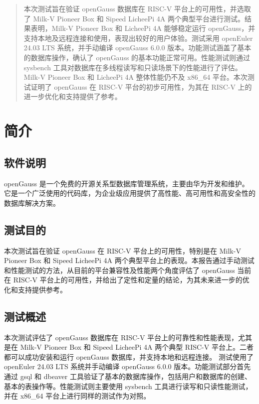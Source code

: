 \documentclass{article}
\begin{document}
\maketitle

\begin{abstract}
本次测试旨在验证 openGauss 数据库在 RISC-V 平台上的可用性，并选取了 Milk-V Pioneer Box 和 Sipeed LicheePi 4A 两个典型平台进行测试。结果表明，Milk-V Pioneer Box 和 LicheePi 4A 能够稳定运行 openGauss，并支持本地及远程连接和使用，表现出较好的用户体验。测试采用 openEuler 24.03 LTS 系统，并手动编译 openGauss 6.0.0 版本。功能测试涵盖了基本的数据库操作，确认了 openGauss 的基本功能正常可用。性能测试则通过 sysbench 工具对数据库在多线程读写和只读场景下的性能进行了评估。Milk-V Pioneer Box 和 LicheePi 4A 整体性能仍不及 x86\_64 平台。本次测试证明了 openGauss 在 RISC-V 平台的初步可用性，为其在 RISC-V 上的进一步优化和支持提供了参考。
\end{abstract}

\thispagestyle{empty} %

\newpage
\tableofcontents

\newpage

\section{简介}

\subsection{软件说明}
openGauss 是一个免费的开源关系型数据库管理系统，主要由华为开发和维护。它是一个广泛使用的代码库，为企业级应用提供了高性能、高可用性和高安全性的数据库解决方案。

\subsection{测试目的}
本次测试旨在验证 openGauss 在 RISC-V 平台上的可用性，特别是在 Milk-V Pioneer Box 和 Sipeed LicheePi 4A 两个典型平台上的表现。本报告通过手动测试和性能测试的方法，从目前的平台兼容性及性能两个角度评估了 openGauss 当前在 RISC-V 平台上的可用性，并给出了定性和定量的结论，为其未来进一步的优化和支持提供参考。

\subsection{测试概述}
本次测试评估了 openGauss 数据库在 RISC-V 平台上的可靠性和性能表现，尤其是在 Milk-V Pioneer Box 和 Sipeed LicheePi 4A 两个典型 RISC-V 平台上。二者都可以成功安装和运行 openGauss 数据库，并支持本地和远程连接。
测试使用了 openEuler 24.03 LTS 系统并手动编译 openGauss 6.0.0 版本。功能测试部分首先通过 gsql 和 dbeaver 工具验证了基本的数据库操作，包括用户和数据库的创建、基本的表操作等。性能测试则主要使用 sysbench 工具进行读写和只读性能测试，并在 x86\_64 平台上进行同样的测试作为对照。
\end{document}

